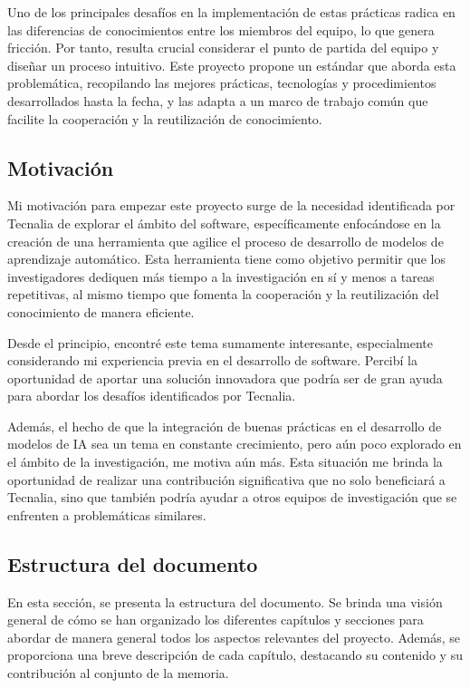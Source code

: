Uno de los principales desafíos en la implementación de estas prácticas radica en las diferencias 
de conocimientos entre los miembros del equipo, lo que genera fricción. Por tanto, resulta crucial 
considerar el punto de partida del equipo y diseñar un proceso intuitivo. Este proyecto propone 
un estándar que aborda esta problemática, recopilando las mejores prácticas, tecnologías y 
procedimientos desarrollados hasta la fecha, y las adapta a un marco de trabajo común que
facilite la cooperación y la reutilización de conocimiento.

\subsection{Motivación}
Mi motivación para empezar este proyecto surge de la necesidad identificada por Tecnalia de 
explorar el ámbito del software, específicamente enfocándose en la creación de una herramienta 
que agilice el proceso de desarrollo de modelos de aprendizaje automático. Esta herramienta tiene 
como objetivo permitir que los investigadores dediquen más tiempo a la investigación en sí y 
menos a tareas repetitivas, al mismo tiempo que fomenta la cooperación y la reutilización del 
conocimiento de manera eficiente.\medskip

Desde el principio, encontré este tema sumamente interesante, especialmente considerando mi 
experiencia previa en el desarrollo de software. Percibí la oportunidad de aportar una 
solución innovadora que podría ser de gran ayuda para abordar los desafíos identificados por Tecnalia.\medskip

Además, el hecho de que la integración de buenas prácticas en el desarrollo de modelos de IA 
sea un tema en constante crecimiento, pero aún poco explorado en el ámbito de la investigación, 
me motiva aún más. Esta situación me brinda la oportunidad de realizar una contribución significativa 
que no solo beneficiará a Tecnalia, sino que también podría ayudar a otros equipos de investigación 
que se enfrenten a problemáticas similares.

\subsection{Estructura del documento}
En esta sección, se presenta la estructura del documento. Se 
brinda una visión general de cómo se han organizado los diferentes capítulos y secciones 
para abordar de manera general todos los aspectos relevantes del proyecto. 
Además, se proporciona una breve descripción de cada capítulo, destacando su contenido 
y su contribución al conjunto de la memoria.

